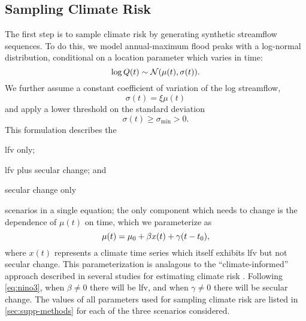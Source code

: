 \documentclass[
  draft,
  linenumbers
]{agujournal2018}
\newcommand{\normal}{\mathcal{N}}
\begin{document}
\subsection{Sampling Climate Risk}\label{sec:methods-generating}

The first step is to sample climate risk by generating synthetic streamflow sequences.
To do this, we model  annual-maximum flood peaks with a log-normal distribution, conditional on a location parameter which varies in time:
\begin{equation} \label{eq:log-normal}
  \log Q(t) \sim \normal \qty(\mu(t), \sigma(t)).
\end{equation}
We further assume a constant coefficient of variation of the log streamflow,
\begin{equation}
  \sigma(t) = \xi \mu(t)  
\end{equation}
and apply a lower threshold on the standard deviation
\begin{equation}
  \sigma(t) \geq \sigma_\text{min} > 0.
\end{equation}
This formulation describes the \begin{enumerate*}[label= (\roman*)]
  \item \gls{lfv} only;
  \item \gls{lfv} plus secular change; and
  \item secular change only
\end{enumerate*}
scenarios in a single equation; the only component which needs to change is the dependence of $\mu(t)$ on time, which we parameterize as
\begin{equation}\label{eq:nino3}
  \mu(t) = \mu_0 + \beta x(t) + \gamma \qty(t - t_0),
\end{equation}
where $x(t)$ represents a climate time series which itself exhibits \gls{lfv} but not secular change.
This parameterization is analagous to the ``climate-informed'' approach described in several studies for estimating climate risk \citep{Delgado:2014ey,Merz:2014gf,Farnham:2018gs}.
Following \cref{eq:nino3}, when $\beta \neq 0$ there will be \gls{lfv}, and when $\gamma \neq 0$ there will be secular change.
The values of all parameters used for sampling climate risk are listed in \cref{sec:supp-methods} for each of the three scenarios considered.
\end{document}
